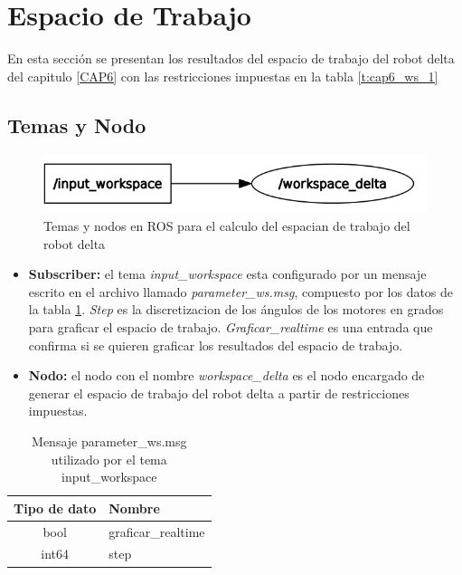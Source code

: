 \newpage


\section{Espacio de Trabajo}
        En esta sección se presentan los resultados del espacio de trabajo del robot delta del capitulo \ref{CAP6} con las restricciones impuestas en la tabla \ref{t:cap6_ws_1}
        
    \subsection{Temas y Nodo}
    
        \begin{figure}[h]
            \centering
            \includegraphics[width=1.0\linewidth]{Main/Chapter7/Images7/nodo_2.png}
            \caption{Temas y nodos en ROS para el calculo del espacian de trabajo del robot delta}
            \label{f:cap7_rviz2222}
        \end{figure}    
    
    \begin{itemize}
        \item {\textbf{Subscriber:}  el tema \textit{input\_workspace} esta configurado por un mensaje escrito en el archivo llamado \textit{parameter\_ws.msg}, compuesto por los datos de la tabla \ref{tab:cap6_rviz_4_msg}. \textit{Step} es la discretizacion de los ángulos de los motores en grados para graficar el espacio de trabajo. \textit{Graficar\_realtime} es una entrada que confirma si se quieren graficar los resultados del espacio de trabajo. }
        \item {\textbf{Nodo:} el nodo con el nombre \textit{workspace\_delta} es el nodo encargado de generar el espacio de trabajo del robot delta a partir de restricciones impuestas.}
    \end{itemize}
    
        
            \begingroup
            \renewcommand{\arraystretch}{2.0}
            \begin{table}[H]
                \centering
                \begin{tabular}{c m{3.0cm}}
                   \hline                   
                   \textbf{Tipo de dato}  & \textbf{Nombre}    \\\hline \hline 
                    bool & graficar\_realtime
                   \\\hline
                    int64 & step
                    \\\hline                   
                \end{tabular}
                \caption{Mensaje parameter\_ws.msg utilizado por el tema input\_workspace}
                \label{tab:cap6_rviz_4_msg}
            \end{table}
        \endgroup    
        
